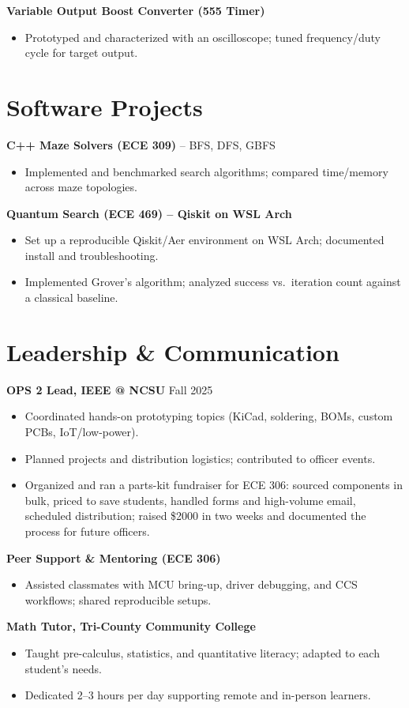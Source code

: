 \documentclass[10pt,letterpaper]{article}
\begin{document}
\textbf{Variable Output Boost Converter (555 Timer)}
\begin{itemize}
  \item Prototyped and characterized with an oscilloscope; tuned frequency/duty cycle for target output.
\end{itemize}

\section*{Software Projects}
\textbf{C++ Maze Solvers (ECE 309)} -- BFS, DFS, GBFS
\begin{itemize}
  \item Implemented and benchmarked search algorithms; compared time/memory across maze topologies.
\end{itemize}

\textbf{Quantum Search (ECE 469) -- Qiskit on WSL Arch}
\begin{itemize}
  \item Set up a reproducible Qiskit/Aer environment on WSL Arch; documented install and troubleshooting.
  \item Implemented Grover’s algorithm; analyzed success vs.\ iteration count against a classical baseline.
\end{itemize}

\section*{Leadership \& Communication}
\textbf{OPS 2 Lead, IEEE @ NCSU} \hfill Fall 2025
\begin{itemize}
  \item Coordinated hands-on prototyping topics (KiCad, soldering, BOMs, custom PCBs, IoT/low-power).
  \item Planned projects and distribution logistics; contributed to officer events.
  \item Organized and ran a parts-kit fundraiser for ECE 306: sourced components in bulk, priced to save students, handled forms and high-volume email, scheduled distribution; raised \$2000 in two weeks and documented the process for future officers.
\end{itemize}


\textbf{Peer Support \& Mentoring (ECE 306)}
\begin{itemize}
  \item Assisted classmates with MCU bring-up, driver debugging, and CCS workflows; shared reproducible setups.
\end{itemize}

\textbf{Math Tutor, Tri-County Community College}
\begin{itemize}
  \item Taught pre-calculus, statistics, and quantitative literacy; adapted to each student’s needs.
  \item Dedicated 2–3 hours per day supporting remote and in-person learners.
\end{itemize}
\end{document}
